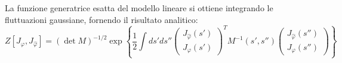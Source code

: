 La funzione generatrice esatta del modello lineare si ottiene integrando le fluttuazioni gaussiane, fornendo il risultato analitico:
\begin{equation*}
Z[J_\varphi, J_{\hat{\varphi}}] = (\det M)^{-1/2} \exp\left\{ \frac{1}{2} \int ds' ds'' \begin{pmatrix} J_{\hat{\varphi}}(s') \\ J_\varphi(s') \end{pmatrix}^T M^{-1}(s',s'') \begin{pmatrix} J_{\hat{\varphi}}(s'') \\ J_\varphi(s'') \end{pmatrix} \right\}
\end{equation*}